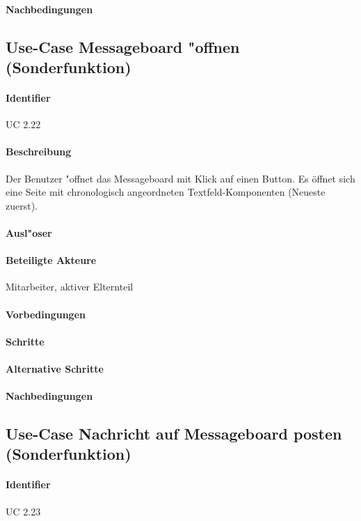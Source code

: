   \paragraph{Nachbedingungen}

  
  \newpage
 \subsection{Use-Case Messageboard "offnen (Sonderfunktion)}
  \paragraph{Identifier}
  UC 2.22
  \paragraph{Beschreibung}
  Der Benutzer "offnet das Messageboard mit Klick auf einen Button. Es öffnet sich eine Seite mit chronologisch angeordneten Textfeld-Komponenten (Neueste zuerst). 
  \paragraph{Ausl"oser}
  \paragraph{Beteiligte Akteure}   \leavevmode \newline
    Mitarbeiter, aktiver Elternteil
  \paragraph{Vorbedingungen}
  \paragraph{Schritte}
  \paragraph{Alternative Schritte}
  \paragraph{Nachbedingungen}

  
  \newpage
 \subsection{Use-Case Nachricht auf Messageboard posten (Sonderfunktion)}
  \paragraph{Identifier}
  UC 2.23
